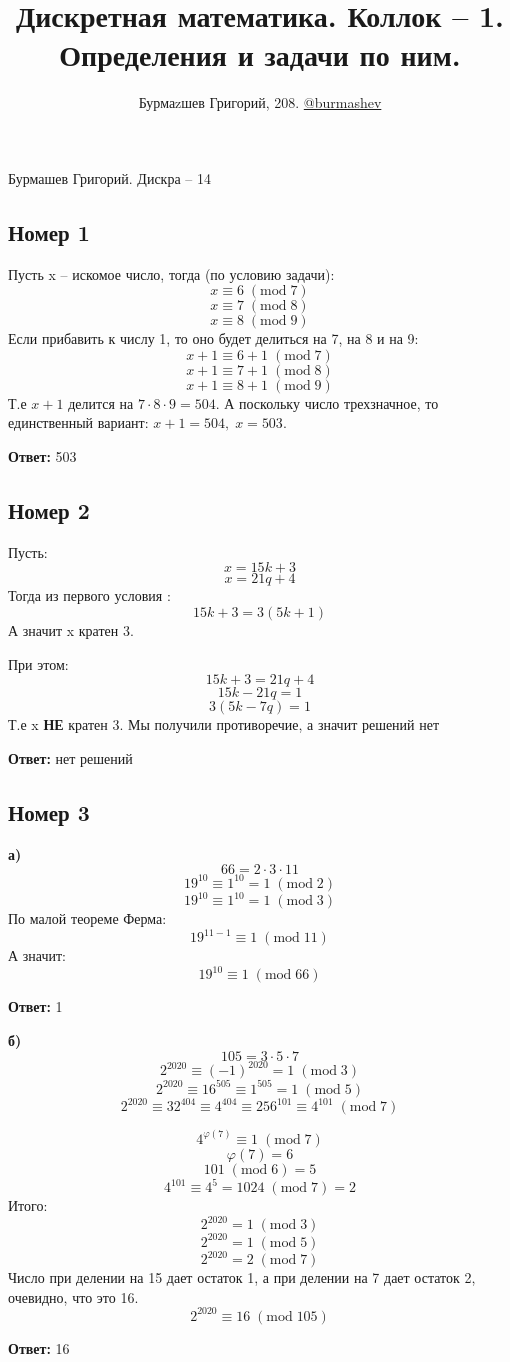 \documentclass[a4paper,12pt]{article}
\author{Бурмаzшев Григорий, 208. \href{https://teleg.run/burmashev}{@burmashev}}
\title{Дискретная математика. Коллок -- 1. Определения и задачи по ним.}
\begin{document}
\begin{center}
Бурмашев Григорий. Дискра -- 14
\end{center}
\subsection*{Номер 1}
Пусть x -- искомое число, тогда (по условию задачи):
\[
x \equiv 6 \;(\text{mod} \; 7)
\]
\[
x \equiv 7 \; (\text{mod}\; 8)
\]
\[
x \equiv 8 \; (\text{mod}\; 9)
\] 
Если прибавить к числу 1, то оно будет делиться на 7, на 8 и на 9:
\[
x +1 \equiv 6 +1 \; (\text{mod} \; 7)
\]\[
x +1 \equiv 7 +1  \;(\text{mod}\; 8)
\]
\[
x +1 \equiv 8 +1  \;(\text{mod}\; 9)
\]
Т.е $x + 1$ делится на $7 \cdot 8 \cdot 9 = 504$. А поскольку число трехзначное, то единственный вариант: $x+1 = 504, \; x = 503$.
\begin{center}
\textbf{Ответ:} 503
\end{center}
\subsection*{Номер 2}
Пусть:
\[
x = 15k + 3
\]
\[
x = 21q + 4
\]
Тогда из первого условия :
\[
15k + 3 = 3(5k + 1)
\]
А значит x кратен 3.

При этом:
\[
15k + 3 = 21q + 4
\]
\[
15k - 21q = 1
\]
\[
3(5k - 7q) = 1
\]
Т.е x \textbf{НЕ} кратен 3. Мы получили противоречие, а значит решений нет
\begin{center}
\textbf{Ответ:} нет решений 
\end{center}
\subsection*{Номер 3}
\textbf{а)} 
\[
66 = 2 \cdot 3 \cdot 11
\]
\[
19^{10} \equiv 1^{10} = 1 \; (\text{mod} \; 2)
\]
\[
19^{10} \equiv 1^{10} = 1 \; (\text{mod} \; 3)
\] 
По малой теореме Ферма:
\[
19^{11 - 1} \equiv 1 \; (\text{mod} \; 11)
\]
А значит:
\[
19^{10} \equiv 1 \; (\text{mod} \; 66)
\]
\begin{center}
\textbf{Ответ:} 1
\end{center}
\textbf{б)}
\[
105 = 3 \cdot 5 \cdot 7 
\]
\[
2^{2020} \equiv (-1)^{2020} = 1 \; (\text{mod} \; 3)
\]
\[
2^{2020} \equiv 16^{505} \equiv 1^{505} = 1  \; (\text{mod} \; 5)
\]
\[
2^{2020} \equiv 32^{404 }  \equiv 4^{404} \equiv 256^{101} \equiv 4^{101} \; (\text{mod} \; 7)
\]


\[
4^{\varphi(7)} \equiv 1 \; (\text{mod} \; 7)
\]
\[
\varphi(7) = 6
\]
\[
101 \;  (\text{mod} \; 6) = 5
\]
\[
4^{101} \equiv 4^5  = 1024 \; (\text{mod} \; 7) = 2 
\]
Итого:
\[
2^{2020} = 1 \; (\text{mod} \; 3)
\]
\[
2^{2020} = 1 \; (\text{mod} \; 5)
\]
\[
2^{2020} = 2 \; (\text{mod} \; 7)
\]
Число при делении на 15 дает остаток 1, а при делении на 7 дает остаток 2, очевидно, что это 16.
\[
2^{2020} \equiv 16 \; (\text{mod} \; 105)
\]
\begin{center}
\textbf{Ответ:} 16
\end{center}
\end{document}
